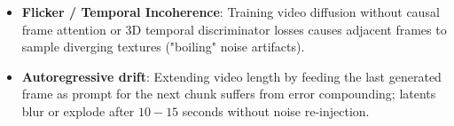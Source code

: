 \begin{trap}
\begin{itemize}
\item \textbf{Flicker / Temporal Incoherence}: Training video diffusion without causal frame attention or 3D temporal discriminator losses causes adjacent frames to sample diverging textures ("boiling" noise artifacts).
\item \textbf{Autoregressive drift}: Extending video length by feeding the last generated frame as prompt for the next chunk suffers from error compounding; latents blur or explode after $10-15$ seconds without noise re-injection.
\end{itemize}
\end{trap}
